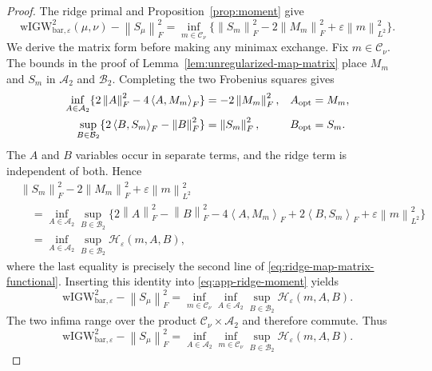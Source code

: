 \documentclass[11pt]{article}
\newcommand{\ip}[2]{\left\langle #1,#2\right\rangle}
\newcommand{\norm}[1]{\left\lVert #1\right\rVert}
\newcommand{\wIGWeps}{\mathrm{wIGW}_{\mathrm{bar},\varepsilon}}
\theoremstyle{plain}
\theoremstyle{definition}
\theoremstyle{remark}
\begin{document}
\begin{proof}
The ridge primal and Proposition~\ref{prop:moment} give
\begin{equation}\label{eq:app-ridge-moment}
 \wIGWeps^2(\mu,\nu)-\norm{S_\mu}_F^2
 =\inf_{m\in\mathcal C_\nu}
 \{\norm{S_m}_F^2-2\norm{M_m}_F^2
 +\varepsilon\norm m_{L^2}^2\}.
\end{equation}
We derive the matrix form before making any minimax exchange.  Fix
$m\in\mathcal C_\nu$.  The bounds in the proof of
Lemma~\ref{lem:unregularized-map-matrix} place $M_m$ and $S_m$ in
$\mathcal A_2$ and $\mathcal B_2$.  Completing the two Frobenius squares gives
\begin{align}
 \inf_{A\in\mathcal A_2}
 \{2\norm A_F^2-4\ip A{M_m}_F\}
 &=-2\norm{M_m}_F^2,
 & A_{\rm opt}&=M_m,
 \label{eq:app-ridge-A-fenchel}\\
 \sup_{B\in\mathcal B_2}
 \{2\ip B{S_m}_F-\norm B_F^2\}
 &=\norm{S_m}_F^2,
 & B_{\rm opt}&=S_m.
 \label{eq:app-ridge-B-fenchel}
\end{align}
The $A$ and $B$ variables occur in separate terms, and the ridge term is
independent of both.  Hence
\begin{align*}
 &\norm{S_m}_F^2-2\norm{M_m}_F^2
   +\varepsilon\norm m_{L^2}^2\\
 &\quad=\inf_{A\in\mathcal A_2}\sup_{B\in\mathcal B_2}
 \bigl\{2\norm A_F^2-\norm B_F^2
 -4\ip A{M_m}_F+2\ip B{S_m}_F
 +\varepsilon\norm m_{L^2}^2\bigr\}\\
 &\quad=\inf_{A\in\mathcal A_2}\sup_{B\in\mathcal B_2}
 \mathcal H_\varepsilon(m,A,B),
\end{align*}
where the last equality is precisely the second line of
\eqref{eq:ridge-map-matrix-functional}.  Inserting this identity into
\eqref{eq:app-ridge-moment} yields
\[
 \wIGWeps^2-\norm{S_\mu}_F^2
 =\inf_{m\in\mathcal C_\nu}\inf_{A\in\mathcal A_2}
   \sup_{B\in\mathcal B_2}\mathcal H_\varepsilon(m,A,B).
\]
The two infima range over the product
$\mathcal C_\nu\times\mathcal A_2$ and therefore commute.  Thus
\[
 \wIGWeps^2-\norm{S_\mu}_F^2
 =\inf_{A\in\mathcal A_2}\inf_{m\in\mathcal C_\nu}
   \sup_{B\in\mathcal B_2}\mathcal H_\varepsilon(m,A,B).
\]


\end{proof}
\end{document}
